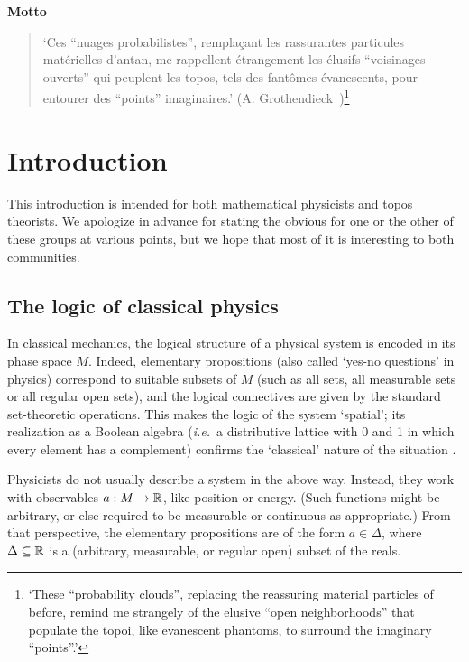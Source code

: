 \documentclass[12pt]{article}
\newcommand{\raw}{\rightarrow} \newcommand{\rat}{\mapsto}
\newcommand{\ie}{\textit{i.e.}}
\begin{document}
\begin{center}\textbf{Motto}
\begin{quote}
  `Ces ``nuages probabilistes'', rempla\c{c}ant les rassurantes
  particules mat{\'e}rielles d'antan, me rappellent {\'e}trangement
  les {\'e}lusifs ``voisinages ouverts'' qui peuplent les topos, tels
  des fant{\^o}mes {\'e}vanescents, pour entourer des ``points''
  imaginaires.'
  (A. Grothendieck~\cite{grothendieck:rs})\footnote{`These
  ``probability clouds'', replacing the reassuring material particles
  of before, remind me strangely of the elusive ``open neighborhoods''
  that populate the topoi, like evanescent phantoms, to surround the
  imaginary ``points''.'}
\end{quote}
\end{center}
\newpage

\section{Introduction}
This introduction is intended for both mathematical physicists and topos theorists. We apologize in advance for
stating the obvious for one or the other of these groups at various points, but we hope that most of it is interesting to both communities.
\subsection{The logic of classical physics}\label{lcp}
In classical mechanics, the logical structure of a physical system is encoded in its phase space $M$.
Indeed, elementary propositions (also called `yes-no questions' in physics) correspond to suitable subsets of $M$
(such as all sets, all measurable sets or all regular open sets),  and the logical connectives
are given by the standard set-theoretic operations. This makes the
logic of the system `spatial'; its realization as a Boolean algebra
(\ie\ a distributive lattice with 0 and 1 in which every element has a
complement) confirms the `classical' nature of the situation \cite{Varadarajan}.

Physicists do not usually describe a system in the above way. Instead, they work with
observables $a:M\raw\R$, like position or energy. (Such functions might be arbitrary, or else required to be measurable or continuous as appropriate.)
 From that perspective, the  elementary propositions  are of the form $a\in \Delta$, where  $\Delta\subseteq {\mathbb R}$ is a (arbitrary, measurable, or regular open) subset of the reals.
\end{document}
